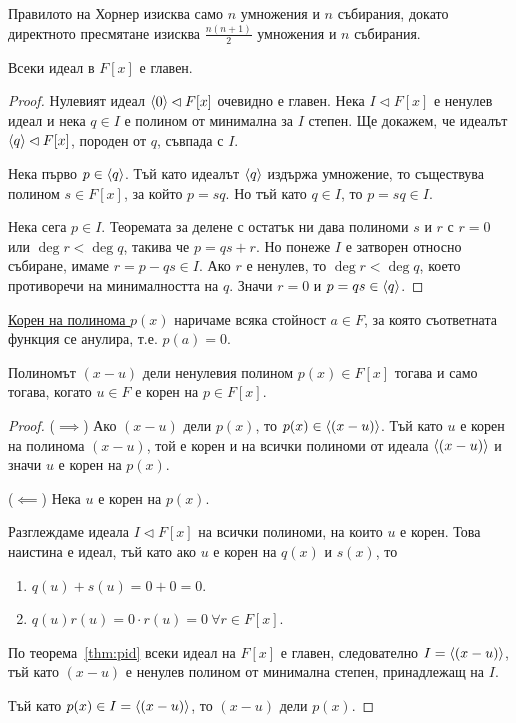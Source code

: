 \documentclass[numbers=endperiod, DIV=15]{scrartcl}
\begin{document}
Правилото на Хорнер изисква само $n$ умножения и $n$ събирания, докато директното пресмятане изисква $\frac {n(n+1)} 2$ умножения и $n$ събирания.

\begin{theorem}\label{thm:pid}
  Всеки идеал в $F[x]$ е главен.
\end{theorem}
\begin{proof}
  Нулевият идеал $\left\langle 0 \right\rangle \lhd F[x]$ очевидно е главен. Нека $I \lhd F[x]$ е ненулев идеал и нека $q \in I$ е полином от минимална за $I$ степен. Ще докажем, че идеалът $\left\langle q \right\rangle \lhd F[x]$, породен от $q$, съвпада с $I$.

  Нека първо $p \in \left\langle q \right\rangle$. Тъй като идеалът $\left\langle q \right\rangle$ издържа умножение, то съществува полином $s \in F[x]$, за който $p = sq$. Но тъй като $q \in I$, то $p = sq \in I$.

  Нека сега $p \in I$. Теоремата за делене с остатък ни дава полиноми $s$ и $r$ с $r = 0$ или $\deg r < \deg q$, такива че $p = qs + r$. Но понеже $I$ е затворен относно събиране, имаме $r = p - qs \in I$. Ако $r$ е ненулев, то $\deg r < \deg q$, което противоречи на минималността на $q$. Значи $r = 0$ и $p = qs \in \left\langle q \right\rangle$.
\end{proof}

\begin{definition}
  \underline{Корен на полинома $p(x)$} наричаме всяка стойност $a \in F$, за която съответната функция се анулира, т.е. $p(a) = 0$.
\end{definition}

\begin{proposition}\label{thm:div-iff-root}
  Полиномът $(x - u)$ дели ненулевия полином $p(x) \in F[x]$ тогава и само тогава, когато $u \in F$ е корен на $p \in F[x]$.
\end{proposition}
\begin{proof}
  ($\implies$) Ако $(x - u)$ дели $p(x)$, то $p(x) \in \left\langle (x - u) \right\rangle$. Тъй като $u$ е корен на полинома $(x - u)$, той е корен и на всички полиноми от идеала $\left\langle (x - u) \right\rangle$ и значи $u$ е корен на $p(x)$.

  ($\impliedby$) Нека $u$ е корен на $p(x)$.

  Разглеждаме идеала $I \lhd F[x]$ на всички полиноми, на които $u$ е корен. Това наистина е идеал, тъй като ако $u$ е корен на $q(x)$ и $s(x)$, то
  \begin{enumerate}
    \item $q(u) + s(u) = 0 + 0 = 0$.
    \item $q(u) r(u) = 0 \cdot r(u) = 0~\forall r \in F[x]$.
  \end{enumerate}

  По теорема~\ref{thm:pid} всеки идеал на $F[x]$ е главен, следователно $I = \left\langle (x - u) \right\rangle$, тъй като $(x - u)$ е ненулев полином от минимална степен, принадлежащ на $I$.

  Тъй като $p(x) \in I = \left\langle (x - u) \right\rangle$, то $(x - u)$ дели $p(x)$.
\end{proof}
\end{document}
